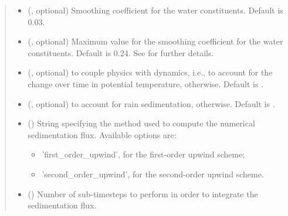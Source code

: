 \documentclass[letterpaper,10pt,english]{sphinxmanual}
\begin{document}
\begin{fulllineitems}
\begin{fulllineitems}
\begin{quote}
\begin{description}
\begin{itemize}
\item {} 
 (, optional) \textendash{} Smoothing coefficient for the water constituents. Default is 0.03.

\item {} 
 (, optional) \textendash{} Maximum value for the smoothing coefficient for the water constituents. Default is 0.24.
See {\hyperref[\detokenize{api:tasmania.dycore.horizontal_smoothing.HorizontalSmoothing}]{}} for further details.

\item {} 
 (, optional) \textendash{}  to couple physics with dynamics, i.e., to account for the change over time in potential
temperature,  otherwise. Default is .

\item {} 
 (, optional) \textendash{}  to account for rain sedimentation,  otherwise. Default is .

\item {} 
 () \textendash{} 
String specifying the method used to compute the numerical sedimentation flux. Available options are:
\begin{itemize}
\item {} 
’first\_order\_upwind’, for the first-order upwind scheme;

\item {} 
’second\_order\_upwind’, for the second-order upwind scheme.

\end{itemize}


\item {} 
 () \textendash{} Number of sub-timesteps to perform in order to integrate the sedimentation flux.

\end{itemize}

\end{description}\end{quote}


\end{fulllineitems}
\end{fulllineitems}
\end{document}
